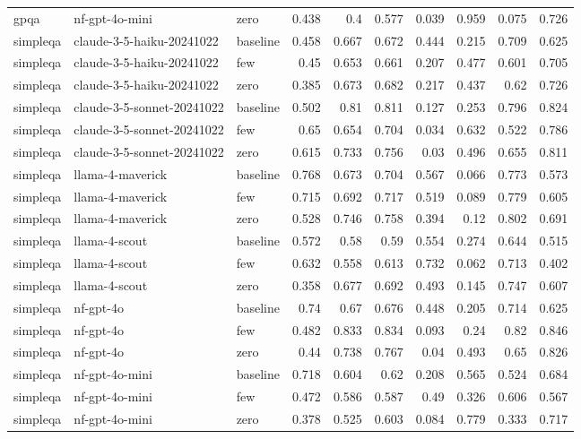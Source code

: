 \begin{table}[htbp]
\begin{tabular}{lllrrrrrrr}
gpqa & nf-gpt-4o-mini & zero & 0.438 & 0.4 & 0.577 & 0.039 & 0.959 & 0.075 & 0.726 \\
simpleqa & claude-3-5-haiku-20241022 & baseline & 0.458 & 0.667 & 0.672 & 0.444 & 0.215 & 0.709 & 0.625 \\
simpleqa & claude-3-5-haiku-20241022 & few & 0.45 & 0.653 & 0.661 & 0.207 & 0.477 & 0.601 & 0.705 \\
simpleqa & claude-3-5-haiku-20241022 & zero & 0.385 & 0.673 & 0.682 & 0.217 & 0.437 & 0.62 & 0.726 \\
simpleqa & claude-3-5-sonnet-20241022 & baseline & 0.502 & 0.81 & 0.811 & 0.127 & 0.253 & 0.796 & 0.824 \\
simpleqa & claude-3-5-sonnet-20241022 & few & 0.65 & 0.654 & 0.704 & 0.034 & 0.632 & 0.522 & 0.786 \\
simpleqa & claude-3-5-sonnet-20241022 & zero & 0.615 & 0.733 & 0.756 & 0.03 & 0.496 & 0.655 & 0.811 \\
simpleqa & llama-4-maverick & baseline & 0.768 & 0.673 & 0.704 & 0.567 & 0.066 & 0.773 & 0.573 \\
simpleqa & llama-4-maverick & few & 0.715 & 0.692 & 0.717 & 0.519 & 0.089 & 0.779 & 0.605 \\
simpleqa & llama-4-maverick & zero & 0.528 & 0.746 & 0.758 & 0.394 & 0.12 & 0.802 & 0.691 \\
simpleqa & llama-4-scout & baseline & 0.572 & 0.58 & 0.59 & 0.554 & 0.274 & 0.644 & 0.515 \\
simpleqa & llama-4-scout & few & 0.632 & 0.558 & 0.613 & 0.732 & 0.062 & 0.713 & 0.402 \\
simpleqa & llama-4-scout & zero & 0.358 & 0.677 & 0.692 & 0.493 & 0.145 & 0.747 & 0.607 \\
simpleqa & nf-gpt-4o & baseline & 0.74 & 0.67 & 0.676 & 0.448 & 0.205 & 0.714 & 0.625 \\
simpleqa & nf-gpt-4o & few & 0.482 & 0.833 & 0.834 & 0.093 & 0.24 & 0.82 & 0.846 \\
simpleqa & nf-gpt-4o & zero & 0.44 & 0.738 & 0.767 & 0.04 & 0.493 & 0.65 & 0.826 \\
simpleqa & nf-gpt-4o-mini & baseline & 0.718 & 0.604 & 0.62 & 0.208 & 0.565 & 0.524 & 0.684 \\
simpleqa & nf-gpt-4o-mini & few & 0.472 & 0.586 & 0.587 & 0.49 & 0.326 & 0.606 & 0.567 \\
simpleqa & nf-gpt-4o-mini & zero & 0.378 & 0.525 & 0.603 & 0.084 & 0.779 & 0.333 & 0.717 \\
\bottomrule
\end{tabular}
\end{table}

